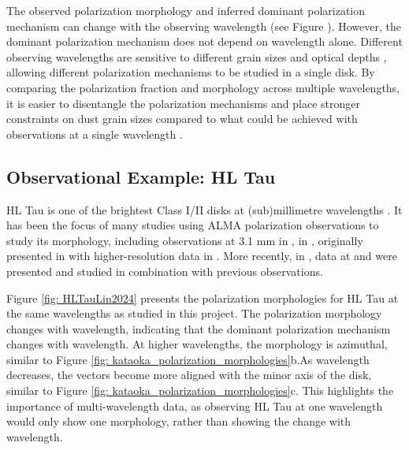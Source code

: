 The observed polarization morphology and inferred dominant polarization mechanism can change with the observing wavelength (see Figure \add{}). However, the dominant polarization mechanism does not depend on wavelength alone. Different observing wavelengths are sensitive to different grain sizes and optical depths \citep{Testi}, allowing different polarization mechanisms to be studied in a single disk. By comparing the polarization fraction and morphology across multiple wavelengths, it is easier to disentangle the polarization mechanisms and place stronger constraints on dust grain sizes compared to what could be achieved with observations at a single wavelength \citep{Kataoka_2015, Harrison2024}. 








\subsection{Observational Example: HL Tau}
\label{sec: intro_HL_Tau}

HL Tau is one of the brightest Class I/II disks at (sub)millimetre wavelengths \citep{Stephens_2017}. It has been the focus of many studies using ALMA polarization observations to study its morphology, including observations at 3.1 mm in \cite{Kataoka_2017}, \bsix in \cite{Stephens_2017}, \bseven originally presented in \cite{Stephens_2017} with higher-resolution data in \cite{Stephens2023}. More recently, in \cite{Lin2024}, data at \bfour and \bfive were presented and studied in combination with previous observations.

Figure \ref{fig: HLTauLin2024} presents the polarization morphologies for HL Tau at the same   wavelengths as studied in this project. The polarization morphology changes with wavelength, indicating that the dominant polarization mechanism changes with wavelength. At higher wavelengths, the morphology is azimuthal, similar to Figure \ref{fig: kataoka_polarization_morphologies}b.As wavelength decreases, the vectors become more aligned with the minor axis of the disk, similar to Figure \ref{fig: kataoka_polarization_morphologies}c. This highlights the importance of multi-wavelength data, as observing HL Tau at one wavelength would only show one morphology, rather than showing the change with wavelength.



